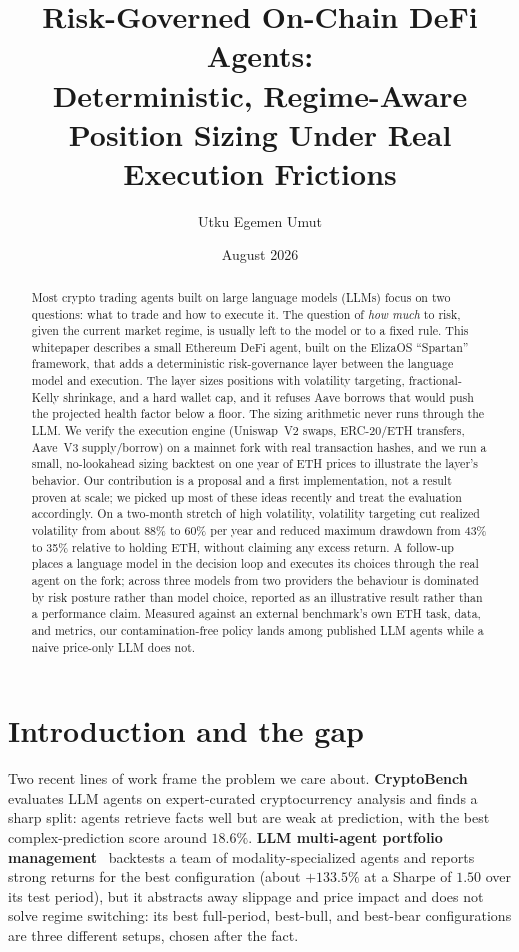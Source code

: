 \documentclass[11pt]{article}
\title{Risk-Governed On-Chain DeFi Agents:\\
Deterministic, Regime-Aware Position Sizing Under Real Execution Frictions}
\author{Utku Egemen Umut}
\date{August 2026}
\begin{document}
\maketitle

\begin{abstract}
Most crypto trading agents built on large language models (LLMs) focus on two questions: what to
trade and how to execute it. The question of \emph{how much} to risk, given the current market
regime, is usually left to the model or to a fixed rule. This whitepaper describes a small Ethereum
DeFi agent, built on the ElizaOS ``Spartan'' framework, that adds a deterministic risk-governance
layer between the language model and execution. The layer sizes positions with volatility targeting,
fractional-Kelly shrinkage, and a hard wallet cap, and it refuses Aave borrows that would push the
projected health factor below a floor. The sizing arithmetic never runs through the LLM. We verify
the execution engine (Uniswap~V2 swaps, ERC-20/ETH transfers, Aave~V3 supply/borrow) on a mainnet
fork with real transaction hashes, and we run a small, no-lookahead sizing backtest on one year of
ETH prices to illustrate the layer's behavior. Our contribution is a proposal and a first
implementation, not a result proven at scale; we picked up most of these ideas recently and treat
the evaluation accordingly. On a two-month stretch of high volatility, volatility targeting cut
realized volatility from about 88\% to 60\% per year and reduced maximum drawdown from 43\% to 35\%
relative to holding ETH, without claiming any excess return. A follow-up places a language model in
the decision loop and executes its choices through the real agent on the fork; across three models
from two providers the behaviour is dominated by risk posture rather than model choice, reported as an
illustrative result rather than a performance claim. Measured against an external benchmark's own ETH
task, data, and metrics, our contamination-free policy lands among published LLM agents while a naive
price-only LLM does not.
\end{abstract}

\section{Introduction and the gap}\label{sec:intro}
Two recent lines of work frame the problem we care about. \textbf{CryptoBench}~\cite{cryptobench}
evaluates LLM agents on expert-curated cryptocurrency analysis and finds a sharp split: agents
retrieve facts well but are weak at prediction, with the best complex-prediction score around
$18.6\%$. \textbf{LLM multi-agent portfolio management}~\cite{mas} backtests a team of
modality-specialized agents and reports strong returns for the best configuration (about $+133.5\%$
at a Sharpe of $1.50$ over its test period), but it abstracts away slippage and price impact and does
not solve regime switching: its best full-period, best-bull, and best-bear configurations are three
different setups, chosen after the fact.
\end{document}
